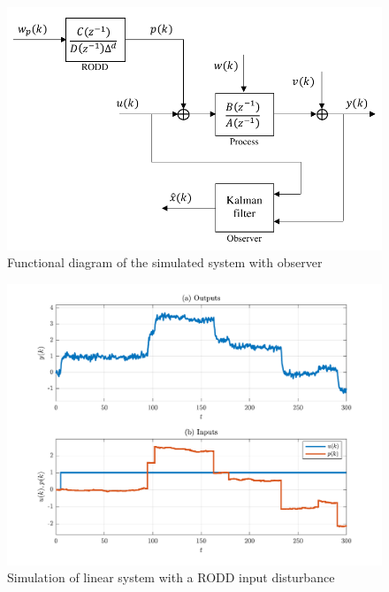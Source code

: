 \begin{figure}[htp]
	\centering
	\includegraphics[width=11.5cm]{images/sim-sys-diag-siso.pdf}
	\caption{Functional diagram of the simulated system with observer}
	\label{fig:sim-sys-diag-siso}
\end{figure}

\begin{figure}[htp]
	\centering
	\includegraphics[width=15cm]{images/rod-obs-sim-1-4-ioplot.pdf}
	\caption{Simulation of linear system with a RODD input disturbance}
	\label{fig:rodd-obs-sim-1-4-ioplot}
\end{figure}

